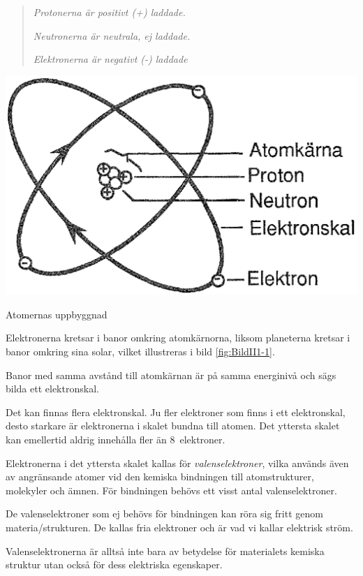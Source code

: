 \begin{quote}
\emph{Protonerna är positivt (+) laddade.}

\emph{Neutronerna är neutrala, ej laddade.}

\emph{Elektronerna är negativt (-) laddade}
\end{quote}

\begin{marginfigure}%
  \includegraphics{images/cropped_pdfs/bild_2_1-01.pdf}
  \caption{Atomernas uppbyggnad}
  \label{fig:BildII1-1}
  \vspace{-20pt}
\end{marginfigure}

Elektronerna kretsar i banor omkring atomkärnorna, liksom
planeterna kretsar i banor omkring sina solar, vilket illustreras i bild
\ref{fig:BildII1-1}.

Banor med samma avstånd till atomkärnan är på samma energinivå och sägs bilda
ett elektronskal.

Det kan finnas flera elektronskal.
Ju fler elektroner som finns i ett elektronskal, desto starkare är elektronerna
i skalet bundna till atomen.
Det yttersta skalet kan emellertid aldrig innehålla fler än 8~elektroner.

Elektronerna i det yttersta skalet kallas för \emph{valenselektroner}, vilka
används även av angränsande atomer vid den kemiska bindningen till
atomstrukturer, molekyler och ämnen.
För bindningen behövs ett visst antal valenselektroner.

De valenselektroner som ej behövs för bindningen kan röra sig fritt genom
materia/strukturen.
De kallas fria elektroner och är vad vi kallar elektrisk ström.

Valenselektronerna är alltså inte bara av betydelse för materialets kemiska
struktur utan också för dess elektriska egenskaper.


